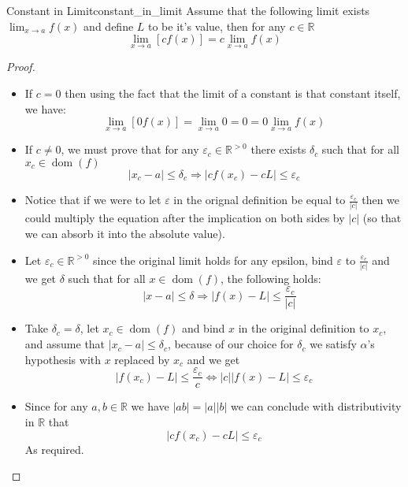 \begin{proposition}{Constant in Limit}{constant_in_limit}
  Assume that the following limit exists $\lim_{x\to a} f\left(x\right)$ and
  define $L$ to be it's value, then for any $c \in \mathbb{R}$ 
  \[
  \lim_{x \to a} \left[ c f\left(x\right) \right] = c \lim_{x\to a} f\left(x\right)
  \]
\end{proposition}

\begin{proof}
\begin{itemize}
  \item If $c = 0$ then using the fact that the limit of a constant is that
      constant itself, we have:
    \[
      \lim_{x \to a} \left[ 0 f\left(x\right)  \right] = \lim_{x\to a} 0 = 0 = 0
      \lim_{x\to a}f\left(x\right)
    \]
  \item If $c \neq 0$, we must prove that for any $\varepsilon _{c} \in
      \mathbb{R} ^{ > 0}$ there exists $\delta_{c}$ such that for all $x_{c} \in
      \operatorname{dom }\left(f\right)$ 
    \[
    \left| x_{c}  -  a \right| \le \delta_{c} \Rightarrow \left| c
    f\left(x_{c}\right)  -  c L \right| \le \varepsilon_{c}
    \]
  \item Notice that if we were to let $\varepsilon$ in the orignal definition be
      equal to $\frac{\varepsilon _{c}}{ \left| c \right|}$ then we could
      multiply the equation after the implication on both sides by $ \left| c
      \right|$ (so that we can absorb it into the absolute value).
  \item Let $\varepsilon_{c} \in \mathbb{R} ^{> 0}$ since the original limit
      holds for any epsilon, bind $\varepsilon$ to $\frac{\varepsilon _{c}}{
      \left| c \right|}$ and we get $\delta$ such that for all $x \in
      \operatorname{dom }\left(f\right)$, the following holds:
    \[
      \quad \left| x  -  a \right| \le \delta \Rightarrow \left| f\left(x\right)
      -  L \right| \le \frac{\varepsilon _{c}}{ \left| c \right|} \tag{$\alpha$}
    \]
  \item Take $\delta_{c} = \delta$, let $x_{c} \in \operatorname{dom
      }\left(f\right)$ and bind $x$ in the original definition to $x_{c}$, and
      assume that $ \left| x_{c}  -  a \right|\le \delta_{c}$, because of our
      choice for $\delta_{c}$ we satisfy $\alpha$'s hypothesis with $x$ replaced
      by $x _{c}$ and we get
    \[
    \left| f\left(x_{c}\right)  -  L \right| \le \frac{\varepsilon_{c}}{c}
    \Leftrightarrow \left| c \right| \left| f\left(x\right)  -  L \right| \le
    \varepsilon_{c}
    \]
    \item Since for any $a, b \in \mathbb{R}$ we have $ \left|  a b \right|=
        \left| a \right| \left|  b \right|$ we can conclude with distributivity
        in $ \mathbb{R}$ that
      \[
      \left| c f\left(x _{c}\right)  -  c L \right| \le \varepsilon_{c}
      \]
     As required.
\end{itemize}
\end{proof}
